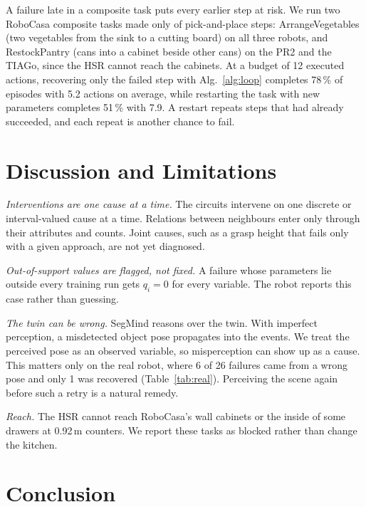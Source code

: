 \documentclass[letterpaper, 10 pt, conference]{ieeeconf}
\newcommand{\dummystyle}{\color{dummy}}
\newcommand{\dummystyle}{}
\newcommand{\dummy}[1]{{\dummystyle #1}}
\newcommand{\robocasa}{RoboCasa}
\newcommand{\segmind}{SegMind}
\begin{document}
A failure late in a composite task puts every earlier step at risk. We run two
\robocasa{} composite tasks made only of pick-and-place steps: ArrangeVegetables
(two vegetables from the sink to a cutting board) on all three robots, and
RestockPantry (cans into a cabinet beside other cans) on the PR2 and the TIAGo,
since the HSR cannot reach the cabinets. At a budget of \dummy{12} executed
actions, recovering only the failed step with Alg.~\ref{alg:loop} completes
\dummy{78}\,\% of episodes with \dummy{5.2} actions on average, while restarting
the task with new parameters completes \dummy{51}\,\% with \dummy{7.9}. A
restart repeats steps that had already succeeded, and each repeat is another
chance to fail.

\section{Discussion and Limitations}
\label{sec:discussion}

\emph{Interventions are one cause at a time.} The circuits intervene on one
discrete or interval-valued cause at a time. Relations between neighbours enter
only through their attributes and counts. Joint causes, such as a grasp height
that fails only with a given approach, are not yet diagnosed.

\emph{Out-of-support values are flagged, not fixed.} A failure whose parameters
lie outside every training run gets $q_i = 0$ for every variable. The robot
reports this case rather than guessing.

\emph{The twin can be wrong.} \segmind{} reasons over the twin. With imperfect
perception, a misdetected object pose propagates into the events. We treat the
perceived pose as an observed variable, so misperception can show up as a cause.
This matters only on the real robot, where \dummy{6} of \dummy{26} failures came
from a wrong pose and only \dummy{1} was recovered (Table~\ref{tab:real}).
Perceiving the scene again before such a retry is a natural remedy.

\emph{Reach.} The HSR cannot reach \robocasa{}'s wall cabinets or the inside of
some drawers at 0.92\,m counters. We report these tasks as blocked rather than
change the kitchen.

\section{Conclusion}
\label{sec:conclusion}
\end{document}
